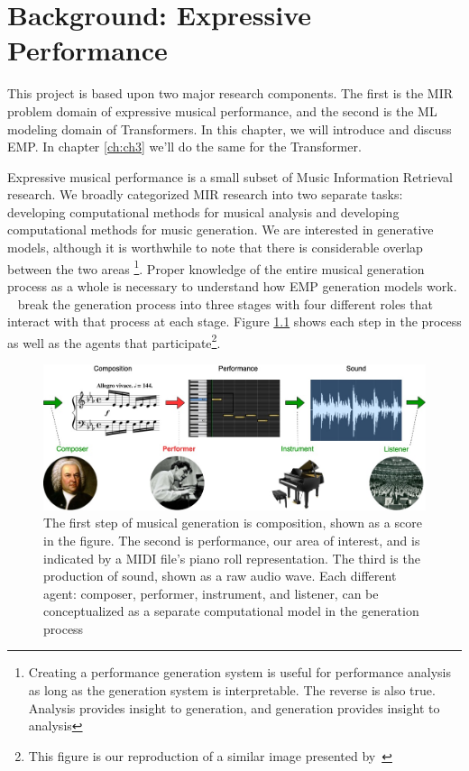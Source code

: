 
\chapter{Background: Expressive Performance}\label{ch:ch2}
This project is based upon two major research components. The first is the MIR problem domain of expressive musical performance, and the second is the ML modeling domain of Transformers. In this chapter, we will introduce and discuss EMP. In chapter \ref{ch:ch3} we'll do the same for the Transformer. 

Expressive musical performance is a small subset of Music Information Retrieval research. We broadly categorized MIR research into two separate tasks: developing computational methods for musical analysis and developing computational methods for music generation. We are interested in generative models, although it is worthwhile to note that there is considerable overlap between the two areas%
\footnote{Creating a performance generation system is useful for performance analysis as long as the generation system is interpretable. The reverse is also true. Analysis provides insight to generation, and generation provides insight to analysis}. Proper knowledge of the entire musical generation process as a whole is necessary to understand how EMP generation models work. ~\citet{ji2020comprehensive} break the generation process into three stages with four different roles that interact with that process at each stage. Figure \ref{fig:generation_process} shows each step in the process as well as the agents that participate\footnote{This figure is our reproduction of a similar image presented by~\citet{ji2020comprehensive}}. 

\begin{figure}
    \centering
    \includegraphics[width=1\linewidth]{figs/ch2/musical_generation.jpg}
    \caption{The first step of musical generation is composition, shown as a score in the figure. The second is performance, our area of interest, and is indicated by a MIDI file's piano roll representation. The third is the production of sound, shown as a raw audio wave. Each different agent: composer, performer, instrument, and listener, can be conceptualized as a separate computational model in the generation process}
    \label{fig:generation_process}
\end{figure}

